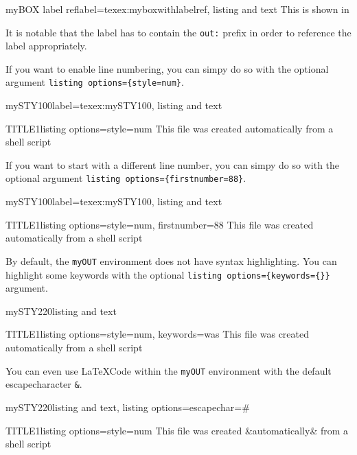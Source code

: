 \documentclass[]{myHOWTO-V001}
\begin{document}
\begin{myTEXEXdoclst}{myBOX label ref}{label={texex:myboxwithlabelref}, listing and text}
This is shown in 
\end{myTEXEXdoclst}

It is notable that the label has to contain the \Verb|out:| prefix in order to reference the label appropriately.

If you want to enable line numbering, you can simpy do so with the optional argument \verb|listing options={style=num}|.

\begin{myTEXEXdoclst}{mySTY100}{label={texex:mySTY100}, listing and text}
\begin{myOUTlst}{TITLE1}{listing options={style=num}}
This file was created automatically from
a shell script
\end{myOUTlst}
\end{myTEXEXdoclst}

If you want to start with a different line number, you can simpy do so with the optional argument \verb|listing options={firstnumber=88}|.

\begin{myTEXEXdoclst}{mySTY100}{label={texex:mySTY100}, listing and text}
\begin{myOUTlst}{TITLE1}{listing options={style=num, firstnumber=88}}
This file was created automatically from
a shell script
\end{myOUTlst}
\end{myTEXEXdoclst}

By default, the \Verb|myOUT| environment does not have syntax highlighting. You can highlight some keywords with the optional \verb|listing options={keywords={}}| argument.

\begin{myTEXEXdoclst}{mySTY220}{listing and text}
\begin{myOUTlst}{TITLE1}{listing options={style=num, keywords={was}}}
This file was created automatically from
a shell script
\end{myOUTlst}
\end{myTEXEXdoclst}

You can even use \LaTeX Code within the \Verb|myOUT| environment with the default escapecharacter \Verb|&|.

\begin{myTEXEXdoclst}{mySTY220}{listing and text, listing options={escapechar=\#}}
\begin{myOUTlst}{TITLE1}{listing options={style=num}}
This file was created &{\color{red}automatically}& from
a shell script
\end{myOUTlst}
\end{myTEXEXdoclst}
\end{document}
